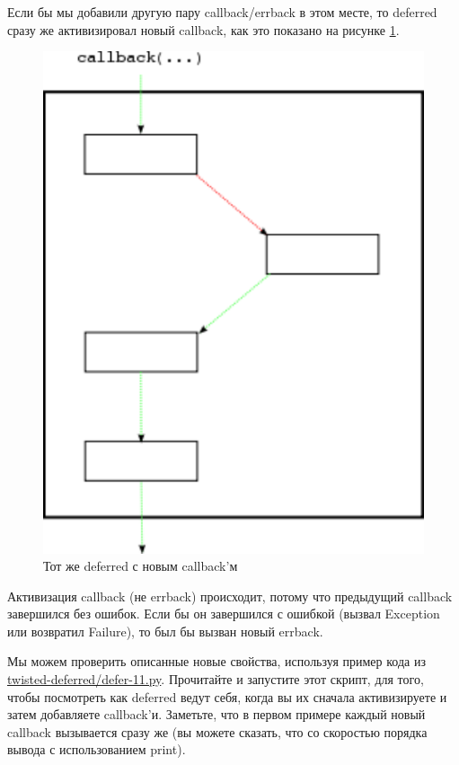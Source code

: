 Если бы мы добавили другую пару callback/errback 
в этом месте, то deferred сразу же активизировал новый 
callback, как это показано на рисунке \ref{fig:deferred-14}.

\begin{figure}[h]
\begin{center}
\includegraphics[height=0.3\textheight]{images/deferred-14.pdf} 
\caption{Тот же deferred с новым callback'м}\label{fig:deferred-14}
\end{center}
\end{figure}


Активизация callback (не errback) происходит, потому что 
предыдущий callback завершился без ошибок. Если бы он 
завершился с ошибкой (вызвал Exception или возвратил Failure), 
то был бы вызван новый errback.


Мы можем проверить описанные новые свойства, используя пример кода из 
\href{http://github.com/jdavisp3/twisted-intro/blob/master/twisted-deferred/defer-11.py#L1}{twisted-deferred/defer-11.py}. Прочитайте и запустите этот скрипт, 
для того, чтобы посмотреть как deferred ведут себя, когда 
вы их сначала активизируете и затем добавляете callback'и. 
Заметьте, что в первом примере каждый новый callback 
вызывается сразу же (вы можете сказать, что со скоростью порядка вывода 
с использованием print).


